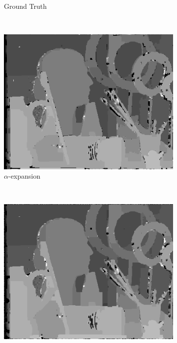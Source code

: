 \documentclass[letterpaper, 10 pt, conference]{ieeeconf}  %
\begin{document}
\begin{figure}[t]
\begin{subfigure}[b]{0.3\textwidth}
                \caption{Ground Truth}
                \label{fig:farm}
        \end{subfigure}
                ~ %
        \begin{subfigure}[b]{0.3\textwidth}
                \centering
                \includegraphics[width=\textwidth]{imgs/l4disparity-expansion.png}
                \caption{$\alpha$-expansion}
                \label{fig:farm}
        \end{subfigure}
                ~ %
        \begin{subfigure}[b]{0.3\textwidth}
                \centering
                \includegraphics[width=\textwidth]{imgs/l4disparity-swap.png}

\end{subfigure}
\end{figure}
\end{document}
